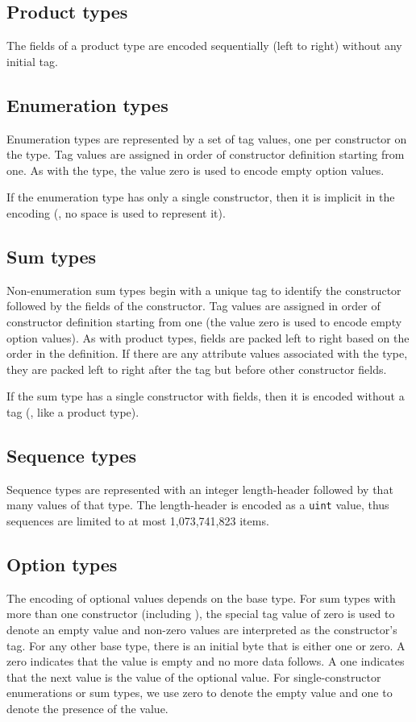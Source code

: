 \subsection{Product types}
The fields of a product type are encoded sequentially (left to right)
without any initial tag.

\subsection{Enumeration types}
Enumeration types are represented by a set of tag values, one per constructor
on the type.
Tag values are assigned in order of constructor definition starting from one.
As with the \lstinline@bool@ type, the value zero is used to encode empty option values.

If the enumeration type has only a single constructor, then it is implicit in
the encoding (\ie{}, no space is used to represent it).

\subsection{Sum types}
Non-enumeration sum types begin with a unique tag to identify the constructor
followed by the fields of the constructor.
Tag values are assigned in order of constructor definition starting from one (the
value zero is used to encode empty option values).
As with product types, fields are packed left to right based on the order
in the definition.
If there are any attribute values associated with the type, they are packed left to right
after the tag but before other constructor fields.

If the sum type has a single constructor with fields, then it is
encoded without a tag (\ie{}, like a product type).

\subsection{Sequence types}
Sequence types are represented with an integer length-header followed by
that many values of that type.
The length-header is encoded as a \lstinline!uint! value, thus sequences are limited
to at most 1,073,741,823 items.

\subsection{Option types}
The encoding of optional values depends on the base type.
For sum types with more than one constructor (including \lstinline@bool@),
the special tag value of zero is used to denote an empty value and
non-zero values are interpreted as the constructor's tag.
For any other base type, there is an initial byte that is either one or zero.
A zero indicates that the value is empty and no more data follows.
A one indicates that the next value is the value of the optional value.
For single-constructor enumerations or sum types, we use zero to denote
the empty value and one to denote the presence of the value.

